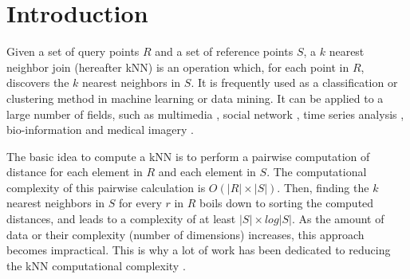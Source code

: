 \section{Introduction}
Given a set of query points $R$ and a set of reference points $S$, a $k$ nearest neighbor join (hereafter kNN) is an operation which, for each point in $R$, discovers 
the $k$ nearest neighbors in $S$. It is frequently used as a classification or clustering method in machine learning or data mining.  It can be applied to 
a large number of fields, such as multimedia \cite{knn_video_matting_iccv2013} \cite{Kriegel:1998:ASS:594718.594761}, social network \cite{Bai:
2011:CPT:2043652.2043659}, time series analysis \cite{Rafiei:1997:SQT:253262.253264} \cite{Agrawal:1993:ESS:645415.652239}, bio-information and medical 
imagery \cite{5930107} \cite{Korn:1996:FNN:645922.673493}. 


The basic idea to compute a kNN is to perform  a pairwise computation of distance for each element in $R$ and each element in $S$. The computational 
complexity of this pairwise calculation is $O(\left|R\right| \times \left| S \right|)$. Then, finding the $k$ nearest neighbors in $S$ for every $r$ in $R$ 
boils down to sorting the computed distances, and leads to a complexity of at least $\left| S \right| \times log \left| S \right|$. As the amount of data 
or their complexity (number of dimensions) increases, this approach becomes impractical. This is why a lot of work has been dedicated to reducing the kNN 
computational 
complexity \cite{DBLP:journals/tods/JagadishOTYZ05} \cite{MuX} \cite{Ciaccia:1997:MEA:645923.671005} \cite{DBLP:journals/geoinformatica/YuZHX10} 
\cite{Bentley:1975:MBS:361002.361007}. %





